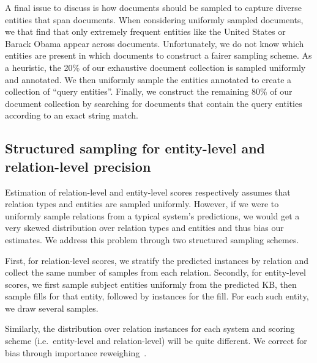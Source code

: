 A final issue to discuss is how documents should be sampled to capture diverse entities that span documents. %
When considering uniformly sampled documents, we that find that only extremely frequent entities like the United States or Barack Obama appear across documents.
Unfortunately, we do not know which entities are present in which documents to construct a fairer sampling scheme.
As a heuristic, the 20\% of our exhaustive document collection is sampled uniformly and annotated.
We then uniformly sample the entities annotated to create a collection of ``query entities''.
Finally, we construct the remaining 80\% of our document collection by searching for documents that contain the query entities according to an exact string match.

\subsection{Structured sampling for entity-level and relation-level precision}
Estimation of relation-level and entity-level scores respectively assumes that relation types and entities are sampled uniformly.
However, if we were to uniformly sample relations from a typical system's predictions, 
  we would get a very skewed distribution over relation types and entities and thus bias our estimates.
We address this problem through two structured sampling schemes.

First, for relation-level scores, we stratify the predicted instances by relation and collect the same number of samples from each relation.
Secondly, for entity-level scores,  we first sample subject entities uniformly from the predicted KB, then sample fills for that entity, followed by instances for the fill.
For each such entity, we draw several samples.

Similarly, the distribution over relation instances for each system and scoring scheme (i.e.\ entity-level and relation-level) will be quite different. We correct for bias through importance reweighing~\citep{}.
